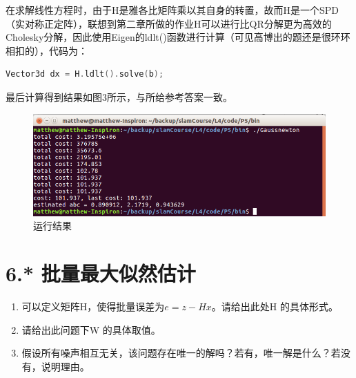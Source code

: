 \documentclass[
	12pt, %
]{fphw} %
\begin{document}
在求解线性方程时，由于H是雅各比矩阵乘以其自身的转置，故而H是一个SPD（实对称正定阵），联想到第二章所做的作业H可以进行比QR分解更为高效的Cholesky分解，因此使用Eigen的ldlt()函数进行计算（可见高博出的题还是很环环相扣的），代码为：
\begin{lstlisting}[language=C++, caption=题5所添代码] 
	Vector3d dx = H.ldlt().solve(b);
\end{lstlisting}
最后计算得到结果如图3所示，与所给参考答案一致。
\begin{figure}[h]
	\centering
	\includegraphics[width=0.8\columnwidth]{pic5.png} %
	\caption{运行结果}
\end{figure}

\clearpage
\section*{6.* 批量最大似然估计}

\begin{problem}

	\begin{enumerate}
		\item 可以定义矩阵H，使得批量误差为$e=z-Hx$。请给出此处H 的具体形式。
		\item 请给出此问题下W 的具体取值。
		\item 假设所有噪声相互无关，该问题存在唯一的解吗？若有，唯一解是什么？若没有，说明理由。
	\end{enumerate}

\end{problem}
\end{document}
